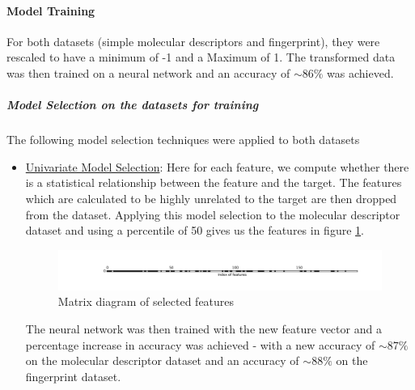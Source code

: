 \documentclass[a4paper,12pt]{report}
\begin{document}
		\paragraph{Model Training}
		For both datasets (simple molecular descriptors and fingerprint), they were rescaled to have a minimum of -1 and a Maximum of 1. The transformed data was then trained on a neural network and an accuracy of $\sim86\%$ was achieved. \\
		\subparagraph{Model Selection on the datasets for training} 
		The following model selection techniques were applied to both datasets
			\begin{itemize}
				\item \underline{Univariate Model Selection}: Here for each feature, we compute whether there is a statistical relationship between the feature and the target. The features which are calculated to be highly unrelated to the target are then dropped from the dataset. Applying this model selection to the molecular descriptor dataset and using a percentile of 50 gives us the features in figure \ref{fig:neuralnetworksmdunivariate}.
					\begin{figure}[h]
						\centering
						\includegraphics[width=\textwidth,scale=1]{images/neural_network_smd_univariate_matrix}
						\caption{Matrix diagram of selected features}
						\label{fig:neuralnetworksmdunivariate}
					\end{figure}
				The neural network was then trained with the new feature vector and a percentage increase in accuracy was achieved - with a new accuracy of $\sim87\%$ on the molecular descriptor dataset and an accuracy of $\sim88\%$ on the fingerprint dataset.
			\end{itemize}
\end{document}
